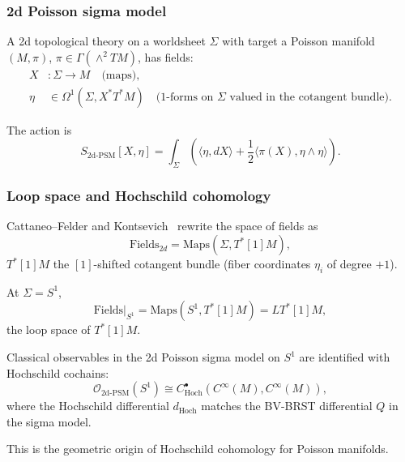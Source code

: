 \subsubsection{2d Poisson sigma model}
A 2d topological theory on a worldsheet $\Sigma$ with target a Poisson manifold $(M, \pi)$, $\pi \in \Gamma(\wedge^2 TM)$, has fields:
\begin{align}
X &: \Sigma \to M \quad \text{(maps)}, \\
\eta &\in \Omega^1(\Sigma, X^* T^*M) \quad \text{(1-forms on $\Sigma$ valued in the cotangent bundle)}.
\end{align}

The action is
\begin{equation}
\label{eq:2d_PSM_action}
S_{\text{2d-PSM}}[X, \eta] = \int_\Sigma \left( \langle \eta, dX \rangle + \frac{1}{2} \langle \pi(X), \eta \wedge \eta \rangle \right).
\end{equation}
\subsubsection{Loop space and Hochschild cohomology}
Cattaneo--Felder and Kontsevich~\cite{Kon03} rewrite the space of fields as
\begin{equation}
\text{Fields}_{2d} = \text{Maps}(\Sigma, T^*[1]M),
\end{equation}
$T^*[1]M$ the $[1]$-shifted cotangent bundle (fiber coordinates $\eta_i$ of degree $+1$).

At $\Sigma = S^1$,
\begin{equation}
\text{Fields}|_{S^1} = \text{Maps}(S^1, T^*[1]M) = LT^*[1]M,
\end{equation}
the loop space of $T^*[1]M$.
\begin{theorem}
\label{thm:2d_PSM_Hochschild}
Classical observables in the 2d Poisson sigma model on $S^1$ are identified with Hochschild cochains:
\begin{equation}
\mathcal{O}_{\text{2d-PSM}}(S^1) \cong C^\bullet_{\text{Hoch}}(C^\infty(M), C^\infty(M)),
\end{equation}
where the Hochschild differential $d_{\text{Hoch}}$ matches the BV-BRST differential $Q$ in the sigma model.
\end{theorem}

This is the geometric origin of Hochschild cohomology for Poisson manifolds.

